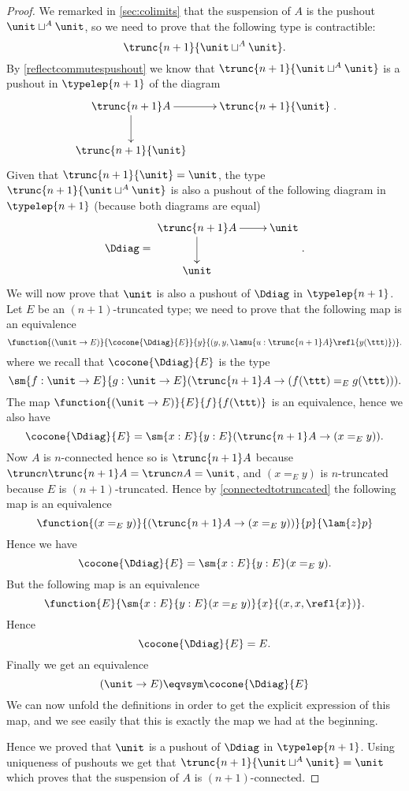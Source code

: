 \begin{proof}
  We remarked in \cref{sec:colimits} that the suspension of $A$ is the pushout $\unit\sqcup^A\unit$, so we need to
  prove that the following type is contractible:
  \[\trunc{n+1}{\unit\sqcup^A\unit}.\]
  By \cref{reflectcommutespushout} we know that
  $\trunc{n+1}{\unit\sqcup^A\unit}$ is a pushout in $\typelep{n+1}$ of the diagram
  \[\xymatrix{\trunc{n+1}A \ar[d] \ar[r] & \trunc{n+1}{\unit} \\
    \trunc{n+1}{\unit} & }.\]
  Given that $\trunc{n+1}{\unit}=\unit$, the type
  $\trunc{n+1}{\unit\sqcup^A\unit}$ is also a pushout of the following diagram in
  $\typelep{n+1}$ (because both diagrams are equal)
  \[\Ddiag=\vcenter{\xymatrix{\trunc{n+1}A \ar[d] \ar[r] & \unit \\
    \unit & }}.\]
  We will now prove that $\unit$ is also a pushout of $\Ddiag$ in
  $\typelep{n+1}$.
  Let $E$ be an $(n+1)$-truncated type; we need to prove that the following map
  is an equivalence
  \[\function{(\unit \to E)}{\cocone{\Ddiag}{E}}{y}
  {(y,y,\lamu{u:{\trunc{n+1}A}} \refl{y(\ttt)})}.\]
  where we recall that $\cocone{\Ddiag}{E}$ is the type
  \[\sm{f:\unit \to E}{g:\unit \to E}(\trunc{n+1}A\to
  (f(\ttt)=_E{}g(\ttt))).\]
  The map $\function{(\unit\to E)}{E}{f}{f(\ttt)}$ is an equivalence, hence
  we also have
  \[\cocone{\Ddiag}{E}=\sm{x:E}{y:E}(\trunc{n+1}A\to(x=_Ey)).\]
  Now $A$ is $n$-connected hence so is $\trunc{n+1}A$ because
  $\trunc n{\trunc{n+1}A}=\trunc nA=\unit$, and $(x=_Ey)$ is $n$-truncated because
  $E$ is $(n+1)$-truncated. Hence by \cref{connectedtotruncated} the
  following map is an equivalence
  \[\function{(x=_Ey)}{(\trunc{n+1}A\to(x=_Ey))}{p}{\lam{z} p}\]
  Hence we have
  \[\cocone{\Ddiag}{E}=\sm{x:E}{y:E}(x=_Ey).\]
  But the following map is an equivalence
  \[\function{E}{\sm{x:E}{y:E}(x=_Ey)}{x}{(x,x,\refl{x})}.\]
  Hence
  \[\cocone{\Ddiag}{E}=E.\]
  Finally we get an equivalence
  \[(\unit \to E)\eqvsym\cocone{\Ddiag}{E}\]
  We can now unfold the definitions in order to get the explicit expression of
  this map, and we see easily that this is exactly the map we had at the
  beginning.

  Hence we proved that $\unit$ is a pushout of $\Ddiag$ in $\typelep{n+1}$. Using
  uniqueness of pushouts we get that $\trunc{n+1}{\unit\sqcup^A\unit}=\unit$
  which proves that the suspension of $A$ is $(n+1)$-connected.
\end{proof}

